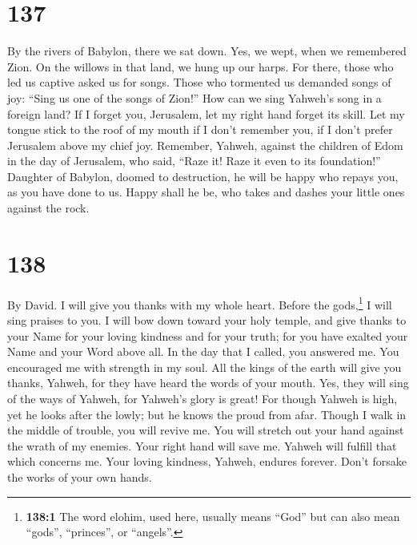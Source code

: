 \hypertarget{section-129}{%
\section{137}\label{section-129}}

 By the rivers of Babylon, there we sat down. Yes, we
wept, when we remembered Zion.  On the willows in that
land, we hung up our harps.  For there, those who led us
captive asked us for songs. Those who tormented us demanded songs of
joy: ``Sing us one of the songs of Zion!''  How can we
sing Yahweh's song in a foreign land?  If I forget you,
Jerusalem, let my right hand forget its skill.  Let my
tongue stick to the roof of my mouth if I don't remember you, if I don't
prefer Jerusalem above my chief joy.  Remember, Yahweh,
against the children of Edom in the day of Jerusalem, who said, ``Raze
it! Raze it even to its foundation!''  Daughter of
Babylon, doomed to destruction, he will be happy who repays you, as you
have done to us.  Happy shall he be, who takes and dashes
your little ones against the rock.

\hypertarget{section-130}{%
\section{138}\label{section-130}}

By David.  I will give you thanks with my whole heart.
Before the gods,\footnote{\textbf{138:1} The word elohim, used here,
  usually means ``God'' but can also mean ``gods'', ``princes'', or
  ``angels''.} I will sing praises to you.  I will bow
down toward your holy temple, and give thanks to your Name for your
loving kindness and for your truth; for you have exalted your Name and
your Word above all.  In the day that I called, you
answered me. You encouraged me with strength in my soul. 
All the kings of the earth will give you thanks, Yahweh, for they have
heard the words of your mouth.  Yes, they will sing of the
ways of Yahweh, for Yahweh's glory is great!  For though
Yahweh is high, yet he looks after the lowly; but he knows the proud
from afar.  Though I walk in the middle of trouble, you
will revive me. You will stretch out your hand against the wrath of my
enemies. Your right hand will save me.  Yahweh will
fulfill that which concerns me. Your loving kindness, Yahweh, endures
forever. Don't forsake the works of your own hands.

